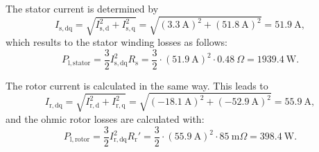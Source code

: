 
\begin{solutionblock}
    The stator current is determined by
    \begin{equation}
        I_{\mathrm{s,dq}} = \sqrt{I_{\mathrm{s,d}}^2 + I_{\mathrm{s,q}}^2}
        = \sqrt{\left(\SI{3.3}{\ampere}\right)^2 + \left(\SI{51.8}{\ampere}\right)^2}
        = \SI{51.9}{\ampere},
    \end{equation}
    which results to the stator winding losses as follows:
    \begin{equation}
        P_{\mathrm{l,stator}} = \frac{3}{2} I_{\mathrm{s,dq}}^2 R_{\mathrm{s}}
        = \frac{3}{2} \cdot \left(\SI{51.9}{\ampere} \right)^2 \cdot \SI{0.48}{\Omega}
        = \SI{1939.4}{\watt}.
    \end{equation}

    The rotor current is calculated in the same way. This leads to
    \begin{equation}
        I_{\mathrm{r,dq}} = \sqrt{I_{\mathrm{r,d}}^2 + I_{\mathrm{r,q}}^2}
        = \sqrt{\left(\SI{-18.1}{\ampere}\right)^2 + \left(\SI{-52.9}{\ampere}\right)^2}
        = \SI{55.9}{\ampere},
    \end{equation}
    and the ohmic rotor losses are calculated with:
    \begin{equation}
        P_{\mathrm{l,rotor}} = \frac{3}{2} I_{\mathrm{r,dq}}^2 R_{\mathrm{r}}'
        = \frac{3}{2} \cdot \left(\SI{55.9}{\ampere} \right)^2 \cdot \SI{85}{\milli\Omega}
        = \SI{398.4}{\watt}.
    \end{equation} 


\end{solutionblock}



